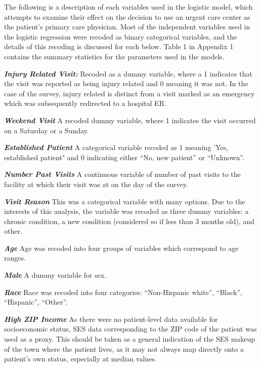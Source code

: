 \documentclass[12pt,twoside]{reedthesis}
\begin{document}
  The following is a description of each variables used in the logistic
  model, which attempts to examine their effect on the decision to use an
  urgent care center as the patient's primary care physician. Most of the
  independent variables used in the logistic regression were recoded as
  binary categorical variables, and the details of this recoding is
  discussed for each below. Table 1 in Appendix 1 contains the summary
  statistics for the parameters used in the models.
  
  \textbf{\emph{Injury Related Visit:}} Recoded as a dummy variable, where
  a 1 indicates that the visit was reported as being injury related and 0
  meaning it was not. In the case of the survey, injury related is
  distinct from a visit marked as an emergency which was subsequently
  redirected to a hospital ER.
  
  \textbf{\emph{Weekend Visit}} A recoded dummy variable, where 1
  indicates the visit occurred on a Saturday or a Sunday.
  
  \textbf{\emph{Established Patient}} A categorical variable recoded as 1
  meaning 'Yes, established patient" and 0 indicating either ``No, new
  patient'' or ``Unknown''.
  
  \textbf{\emph{Number Past Visits}} A continuous variable of number of
  past visits to the facility at which their visit was at on the day of
  the survey.
  
  \textbf{\emph{Visit Reason}} This was a categorical variable with many
  options. Due to the interests of this analysis, the variable was recoded
  as three dummy variables: a chronic condition, a new condition
  (considered so if less than 3 months old), and other.
  
  \textbf{\emph{Age}} Age was recoded into four groups of variables which
  correspond to age ranges.
  
  \textbf{\emph{Male}} A dummy variable for sex.
  
  \textbf{\emph{Race}} Race was recoded into four categories:
  ``Non-Hispanic white'', ``Black'', ``Hispanic'', ``Other''.
  
  \textbf{\emph{High ZIP Income}} As there were no patient-level data
  available for socioeconomic status, SES data corresponding to the ZIP
  code of the patient was used as a proxy. This should be taken as a
  general indication of the SES makeup of the town where the patient
  lives, as it may not always map directly onto a patient's own status,
  especially at median values.
  
\end{document}
